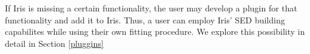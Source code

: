 If Iris is missing a certain functionality, the user may develop a plugin for that functionality and add it to Iris. Thus, a user can employ Iris' SED building capabilites while using their own fitting procedure. We explore this possibility in detail in Section \ref{pluggins}

\begin{comment}
Following the VO effort for seamless interoperability between data services and applications,  

The Virtual Observatory is an effort to standardize data formats and services so that users can seamlessly exchange data back and forth between archives and applications.  

Iris offers a standard means of building large broadband SEDs from different sources in various data formats, while providing robust fitting methods and interactive visualization capabilities.
\end{comment}